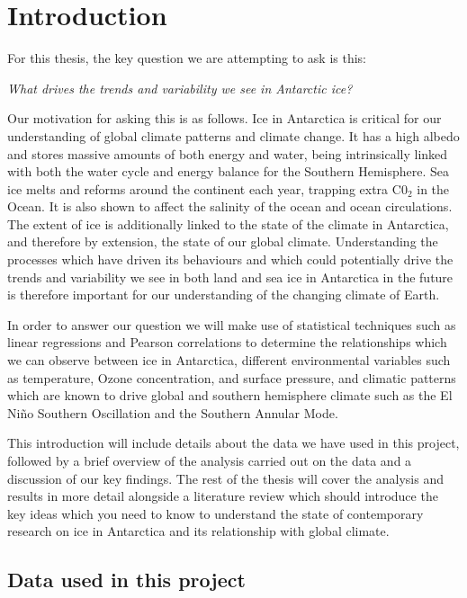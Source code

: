 \documentclass[../main.tex]{subfiles}
\begin{document}
\chapter{Introduction}
\label{chap:introduction}
For this thesis, the key question we are attempting to ask is this:
\medskip 

\begin{tcolorbox}[colback=white!98!black,colframe=gray!60!blue]
\centering
	\textit{What drives the trends and variability we see in Antarctic ice?}
\end{tcolorbox}

Our motivation for asking this is as follows. Ice in Antarctica is critical for our understanding of global climate patterns and climate change. It has a high albedo and stores massive amounts of both energy and water, being intrinsically linked with both the water cycle and energy balance for the Southern Hemisphere. Sea ice melts and reforms around the continent each year, trapping extra C0$_2$ in the Ocean. It is also shown to affect the salinity of the ocean and ocean circulations. 
The extent of ice is additionally linked to the state of the climate in Antarctica, and therefore by extension, the state of our global climate. Understanding the processes which have driven its behaviours and which could potentially drive the trends and variability we see in both land and sea ice in Antarctica in the future is therefore important for our understanding of the changing climate of Earth.

In order to answer our question we will make use of statistical techniques such as linear regressions and Pearson correlations to determine the relationships which we can observe between ice in Antarctica, different environmental variables such as temperature, Ozone concentration, and surface pressure, and climatic patterns which are known to drive global and southern hemisphere climate such as the El Ni\~no Southern Oscillation and the Southern Annular Mode.

This introduction will include details about the data we have used in this project, followed by a brief overview of the analysis carried out on the data and a discussion of our key findings. The rest of the thesis will cover the analysis and results in more detail alongside a literature review which should introduce the key ideas which you need to know to understand the state of contemporary research on ice in Antarctica and its relationship with global climate.


\section{Data used in this project}
\end{document}
